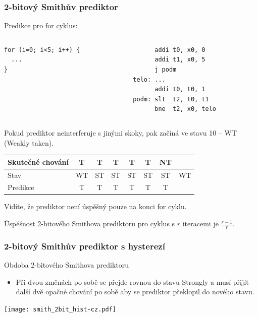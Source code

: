 \documentclass{beamer}
\begin{document}
\begin{frame}[fragile]
\frametitle{2-bitový Smithův prediktor}

Predikce pro for cyklus:

\begin{columns}[T]
\begin{column}{0.35\textwidth}
\begin{verbatim}
for (i=0; i<5; i++) {
  ...
}
\end{verbatim}
\end{column}
\hfill
\begin{column}{0.45\textwidth}
\begin{verbatim}
      addi t0, x0, 0
      addi t1, x0, 5
      j podm
telo: ...
      addi t0, t0, 1
podm: slt  t2, t0, t1
      bne  t2, x0, telo
\end{verbatim}
\end{column}
\end{columns}
\bigskip
\small
Pokud prediktor neinterferuje s jinými skoky, pak začíná ve stavu 10 -- WT (Weakly taken).

\begin{tabular}{|l|c|c|c|c|c|c|c|}\hline
Skutečné chování & T & T & T & T & T & NT &\\ \hline
Stav & WT & ST & ST & ST & ST & ST & WT\\ \hline
Predikce         & T & T & T & T & T & {\color{red}T} &\\ \hline
\end{tabular}

Vidíte, že prediktor není úspěšný pouze na konci for cyklu.

Úspěšnost 2-bitového Smithova prediktoru pro cyklus s $r$ iteracemi je $\frac{r-1}{r}$.
\end{frame}


\begin{frame}
\frametitle{2-bitový Smithův prediktor s hysterezí}

Obdoba 2-bitového Smithova prediktoru
\begin{itemize}
\item Při dvou změnách po sobě se přejde rovnou do stavu Strongly a musí přijít další dvě opačné chování po sobě aby se prediktor překlopil do nového stavu.
\end{itemize}

\begin{center}
\texttt{[image: smith\_2bit\_hist-cz.pdf]}
\end{center}
\end{frame}
\end{document}
